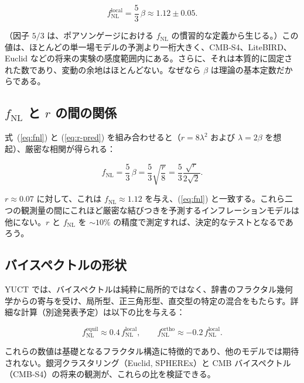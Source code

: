 \documentclass[11pt,a4paper]{article}
\begin{document}
	\begin{equation}
		f_{\text{NL}}^{\text{local}} = \frac{5}{3}\,\beta \approx 1.12 \pm 0.05.
		\label{eq:fnl}
	\end{equation}
	
	（因子 \(5/3\) は、ポアソンゲージにおける \(f_{\text{NL}}\) の慣習的な定義から生じる。）この値は、ほとんどの単一場モデルの予測より一桁大きく、CMB‑S4、LiteBIRD、Euclid などの将来の実験の感度範囲内にある。さらに、それは本質的に固定された数であり、変動の余地はほとんどない。なぜなら \(\beta\) は理論の基本定数だからである。
	
	\subsection{\(f_{\text{NL}}\) と \(r\) の間の関係}
	
	式~(\ref{eq:fnl}) と (\ref{eq:r-pred}) を組み合わせると（\(r = 8\lambda^2\) および \(\lambda = 2\beta\) を想起）、厳密な相関が得られる：
	
	\begin{equation}
		f_{\text{NL}} = \frac{5}{3}\,\beta = \frac{5}{3}\sqrt{\frac{r}{8}} = \frac{5}{3}\frac{\sqrt{r}}{2\sqrt{2}}.
		\label{eq:fnl-r}
	\end{equation}
	
	\(r \approx 0.07\) に対して、これは \(f_{\text{NL}} \approx 1.12\) を与え、(\ref{eq:fnl}) と一致する。これら二つの観測量の間にこれほど厳密な結びつきを予測するインフレーションモデルは他にない。\(r\) と \(f_{\text{NL}}\) を \(\sim 10\%\) の精度で測定すれば、決定的なテストとなるであろう。
	
	\subsection{バイスペクトルの形状}
	
	YUCT では、バイスペクトルは純粋に局所的ではなく、辞書のフラクタル幾何学からの寄与を受け、局所型、正三角形型、直交型の特定の混合をもたらす。詳細な計算（別途発表予定）は以下の比を与える：
	
	\begin{equation}
		f_{\text{NL}}^{\text{equil}} \approx 0.4\, f_{\text{NL}}^{\text{local}}, \qquad
		f_{\text{NL}}^{\text{ortho}} \approx -0.2\, f_{\text{NL}}^{\text{local}}.
		\label{eq:fnl-shapes}
	\end{equation}
	
	これらの数値は基礎となるフラクタル構造に特徴的であり、他のモデルでは期待されない。銀河クラスタリング（Euclid, SPHEREx）と CMB バイスペクトル（CMB‑S4）の将来の観測が、これらの比を検証できる。
	
\end{document}
